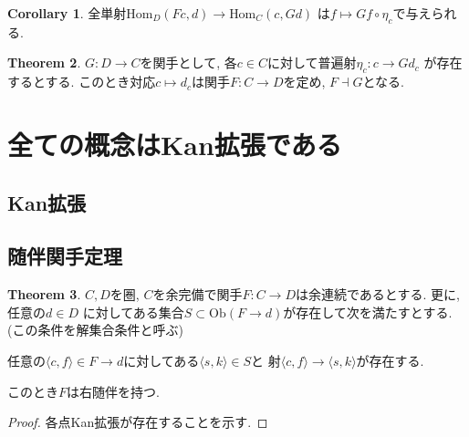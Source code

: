 \documentclass[a4paper,10pt]{article}
\theoremstyle{definition}
\newtheorem{thm}{\bfseries Theorem}[section]
\newtheorem{cor}[thm]{\bfseries Corollary}
\begin{document}
\begin{cor}
    全単射$\textrm{Hom}_D(Fc, d) \rightarrow \textrm{Hom}_C(c, Gd)$
    は$f \mapsto Gf \circ \eta_c$で与えられる.
\end{cor}
\begin{thm}
    $G: D \rightarrow C$を関手として, 各$c \in C$に対して普遍射$\eta_c:c \rightarrow Gd_c$
    が存在するとする. このとき対応$c \mapsto d_c$は関手$F: C \rightarrow D$を定め, $F \dashv G$となる.
\end{thm}
\section{全ての概念はKan拡張である}
\subsection{Kan拡張}
\subsection{随伴関手定理}
\begin{thm}
    $C, D$を圏, $C$を余完備で関手$F:C \rightarrow D$は余連続であるとする. 更に, 任意の$d \in D$
    に対してある集合$S \subset \mathrm{Ob}(F \rightarrow d)$が存在して次を満たすとする.
    (この条件を解集合条件と呼ぶ)
    \begin{center}
        任意の$\langle c,f\rangle \in F \rightarrow d$に対してある$\langle s,k \rangle \in S$と
        射$\langle c, f \rangle \rightarrow \langle s,k \rangle$が存在する.
    \end{center}
    このとき$F$は右随伴を持つ.
\end{thm}
\begin{proof}
    各点Kan拡張が存在することを示す.
\end{proof}
\end{document}
